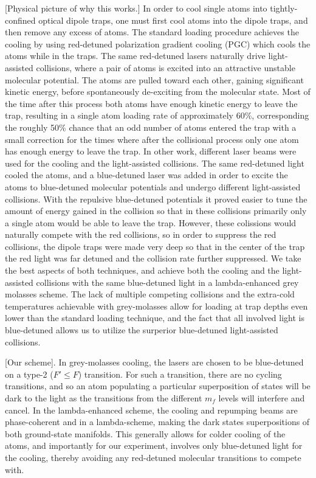 \documentclass[aps,prl,amsmath,amssymb,groupedaddress,10pt,superscriptaddress,floatfix,twocolumn,showkeys,longbibliography]{revtex4-1} %
\begin{document}
[Physical picture of why this works.] In order to cool single atoms into tightly-confined optical dipole traps, one must first cool atoms into the dipole traps, and then remove any excess of atoms. The standard loading procedure achieves the cooling by using red-detuned polarization gradient cooling (PGC) which cools the atoms while in the traps.  The same red-detuned lasers naturally drive light-assisted collisions, where a pair of atoms is excited into an attractive unstable molecular potential. The atoms are pulled toward each other, gaining significant kinetic energy, before spontaneously de-exciting from the molecular state. Most of the time after this process both atoms have enough kinetic energy to leave the trap, resulting in a single atom loading rate of approximately 60\%, corresponding the roughly 50\% chance that an odd number of atoms entered the trap with a small correction for the times where after the collisional process only one atom has enough energy to leave the trap.  In other work, different laser beams were used for the cooling and the light-assisted collisions. The same red-detuned light cooled the atoms, and a blue-detuned laser was added in order to excite the atoms to blue-detuned molecular potentials and undergo different light-assisted collisions. With the repulsive blue-detuned potentials it proved easier to tune the amount of energy gained in the collision so that in these collisions primarily only a single atom would be able to leave the trap. However, these colissions would naturally compete with the red collisions, so in order to suppress the red collisions, the dipole traps were made very deep so that in the center of the trap the red light was far detuned and the collision rate further suppressed.  We take the best aspects of both techniques, and achieve both the cooling and the light-assisted collisions with the same blue-detuned light in a lambda-enhanced grey molasses scheme. The lack of multiple competing collisions and the extra-cold temperatures achievable with grey-molasses allow for loading at trap depths even lower than the standard loading technique, and the fact that all involved light is blue-detuned allows us to utilize the surperior blue-detuned light-assisted collisions.

[Our scheme]. In grey-molasses cooling, the lasers are chosen to be blue-detuned on a type-2 ($F' \le F$) transition. For such a transition, there are no cycling transitions, and so an atom populating a particular superposition of states will be dark to the light as the transitions from the different $m_f$ levels will interfere and cancel. In the lambda-enhanced scheme, the cooling and repumping beams are phase-coherent and in a lambda-scheme, making the dark states superpositions of both ground-state manifolds. This generally allows for colder cooling of the atoms, and importantly for our experiment, involves only blue-detuned light for the cooling, thereby avoiding any red-detuned molecular transitions to compete with.
\end{document}
